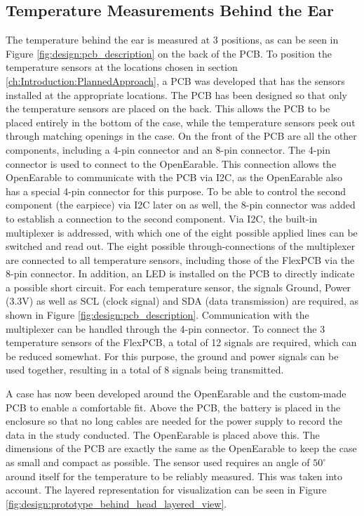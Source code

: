 \subsection{Temperature Measurements Behind the Ear}
\label{ch:Design:Prototype:BehindEar}

The temperature behind the ear is measured at 3 positions, as can be seen in Figure \ref{fig:design:pcb_description} on the back of the PCB.
To position the temperature sensors at the locations chosen in section \ref{ch:Introduction:PlannedApproach}, a PCB was developed that has the sensors installed at the appropriate locations. 
The PCB has been designed so that only the temperature sensors are placed on the back. This allows the PCB to be placed entirely in the bottom of the case, while the temperature sensors peek out through matching openings in the case. On the front of the PCB are all the other components, including a 4-pin connector and an 8-pin connector.
The 4-pin connector is used to connect to the OpenEarable. This connection allows the OpenEarable to communicate with the PCB via I2C, as the OpenEarable also has a special 4-pin connector for this purpose.
To be able to control the second component (the earpiece) via I2C later on as well, the 8-pin connector was added to establish a connection to the second component.
Via I2C, the built-in multiplexer is addressed, with which one of the eight possible applied lines can be switched and read out. The eight possible through-connections of the multiplexer are connected to all temperature sensors, including those of the FlexPCB via the 8-pin connector.
In addition, an LED is installed on the PCB to directly indicate a possible short circuit.
For each temperature sensor, the signals Ground, Power (3.3V) as well as SCL (clock signal) and SDA (data transmission) are required, as shown in Figure \ref{fig:design:pcb_description}. Communication with the multiplexer can be handled through the 4-pin connector.
To connect the 3 temperature sensors of the FlexPCB, a total of 12 signals are required, which can be reduced somewhat. For this purpose, the ground and power signals can be used together, resulting in a total of 8 signals being transmitted.

A case has now been developed around the OpenEarable and the custom-made PCB to enable a comfortable fit.
Above the PCB, the battery is placed in the enclosure so that no long cables are needed for the power supply to record the data in the study conducted.
The OpenEarable is placed above this.
The dimensions of the PCB are exactly the same as the OpenEarable to keep the case as small and compact as possible.
The sensor used requires an angle of $ 50 ^ \circ$ around itself for the temperature to be reliably measured. 
This was taken into account.
The layered representation for visualization can be seen in Figure \ref{fig:design:prototype_behind_head_layered_view}.

